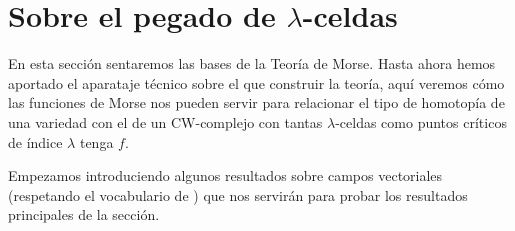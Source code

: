 

\section{Sobre el pegado de $\lambda$-celdas}

En esta sección sentaremos las bases de la Teoría de Morse. Hasta ahora hemos aportado el aparataje técnico sobre el que construir la teoría, aquí veremos cómo las funciones de Morse nos pueden servir para relacionar el tipo de homotopía de una variedad con el de un CW-complejo con tantas $\lambda$-celdas como puntos críticos de índice  $\lambda$ tenga $f$.

\medskip

Empezamos introduciendo algunos resultados sobre campos vectoriales (respetando el vocabulario de \cite{milnor1963}) que nos servirán para probar los resultados principales de la sección.

